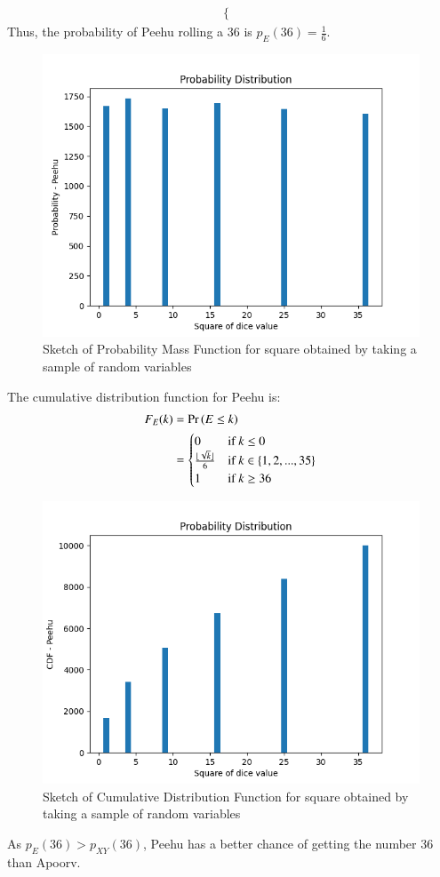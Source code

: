 \documentclass[journal,12pt,twocolumn]{IEEEtran}
\theoremstyle{remark}
\begin{document}
\begin{enumerate}
\begin{align}
\begin{cases}
    \end{cases}
\end{align}
Thus, the probability of Peehu rolling a 36 is $p_E(36) = \frac{1}{6}$.
\begin{figure}[h!]
    \includegraphics[width=\columnwidth]{plots/PDF - Peehu.png}
    \caption{Sketch of Probability Mass Function for square obtained by taking a sample of random variables}
\end{figure}
The cumulative distribution function for Peehu is:
\begin{align}
    F_E(k) &= \Pr\left(E \leq k\right)\\
    &= 
    \begin{cases}
        0 & \text{if }k \leq 0\\
        \frac{\lfloor\sqrt{k}\rfloor}{6} & \text{if }k \in \{1, 2, ..., 35\}\\
        1 & \text{if }k \geq 36
    \end{cases}
\end{align}
\begin{figure}[h!]
    \includegraphics[width=\columnwidth]{plots/CDF - Peehu.png}
    \caption{Sketch of Cumulative Distribution Function for square obtained by taking a sample of random variables}
\end{figure}
\end{enumerate}
As $p_{E}(36) > p_{XY}(36)$, Peehu has a better chance of getting the number 36 than Apoorv.
\end{document}
